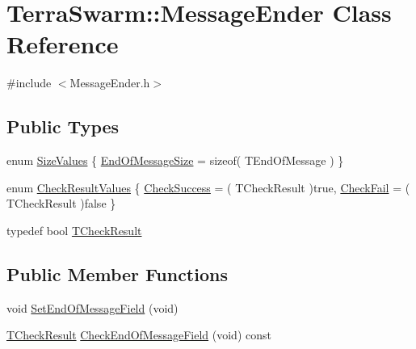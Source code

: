 \hypertarget{class_terra_swarm_1_1_message_ender}{\section{Terra\-Swarm\-:\-:Message\-Ender Class Reference}
\label{class_terra_swarm_1_1_message_ender}
}


{\ttfamily \#include $<$Message\-Ender.\-h$>$}

\subsection*{Public Types}
\begin{DoxyCompactItemize}
\item 
enum \hyperlink{class_terra_swarm_1_1_message_ender_a69b4e82c4fb985160b5bbd11c0fc65ff}{Size\-Values} \{ \hyperlink{class_terra_swarm_1_1_message_ender_a69b4e82c4fb985160b5bbd11c0fc65ffa61b601ee3929906b25d5d72130acc98e}{End\-Of\-Message\-Size} = sizeof( T\-End\-Of\-Message )
 \}
\item 
enum \hyperlink{class_terra_swarm_1_1_message_ender_ad7afbe0b4913ddd8eebac745d343e1cd}{Check\-Result\-Values} \{ \hyperlink{class_terra_swarm_1_1_message_ender_ad7afbe0b4913ddd8eebac745d343e1cda73d1f17b583961365d46511dc24a95a0}{Check\-Success} = ( T\-Check\-Result )true, 
\hyperlink{class_terra_swarm_1_1_message_ender_ad7afbe0b4913ddd8eebac745d343e1cda1a4cb11f4fcd5e5257c47f27650c9cdf}{Check\-Fail} = ( T\-Check\-Result )false
 \}
\item 
typedef bool \hyperlink{class_terra_swarm_1_1_message_ender_a4f3f1bf696190619eb5580c3007ac83a}{T\-Check\-Result}
\end{DoxyCompactItemize}
\subsection*{Public Member Functions}
\begin{DoxyCompactItemize}
\item 
void \hyperlink{class_terra_swarm_1_1_message_ender_af69030fc95ad65634ce03e0edb5f3bdd}{Set\-End\-Of\-Message\-Field} (void)
\item 
\hyperlink{class_terra_swarm_1_1_message_ender_a4f3f1bf696190619eb5580c3007ac83a}{T\-Check\-Result} \hyperlink{class_terra_swarm_1_1_message_ender_abc51a9a7a6fb91254ce5cc2ea8edf5bb}{Check\-End\-Of\-Message\-Field} (void) const 
\end{DoxyCompactItemize}
